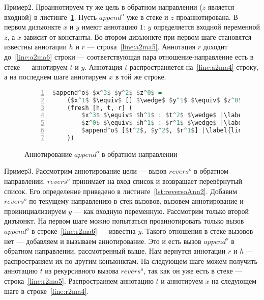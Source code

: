 \documentclass[conference,american,russian]{IEEEtran}
\begin{document}
$Пример 2$. Проаннотируем ту же цель в обратном направлении ($z$ является входной) в листинге~\ref{lst:appendoANN2}.
Пусть $append^o$ уже в стеке и $z$ проаннотирована.
В первом дизъюнкте $x$ и $y$ имеют аннотацию $1$: $y$ определяется входной переменной $z$, а $x$ зависит от константы.
Во втором дизъюнкте при первом шаге становятся известны аннотации $h$ и $r$ --- строка~\ref{line:a2ma5}.
Аннотация $r$ доходит до~\ref{line:a2ma6} строки --- соответствующая пара отношение-направление есть в стеке --- аннотируем $t$ и $y$.
Аннотация $t$ распространяется на~\ref{line:a2ma4} строку, а на последнем шаге аннотируем $x$ в той же строке.

\begin{figure}[h!]
  \begin{center}
  \begin{minipage}{0.3\textwidth}
  \begin{lstlisting}[language=Haskell, frame=single, numbers=left,numberstyle=\small, escapechar=|]
  $append^o$ $x^3$ $y^2$ $z^0$ =
    ($x^1$ $\equiv$ [] $\wedge$ $y^1$ $\equiv$ $z^0$) $\vee$ |\label{line:a2ma2}|
    (fresh [h, t, r] (
        $x^3$ $\equiv$ $h^1$ : $t^2$ $\wedge$ |\label{line:a2ma4}|
        $z^0$ $\equiv$ $h^1$ : $r^1$ $\wedge$ |\label{line:a2ma5}|
        $append^o$ [$t^2$, $y^2$, $r^1$] |\label{line:a2ma6}|
    ))
    \end{lstlisting}
  \end{minipage}
  \end{center}
  \caption{Аннотирование $append^o$ в обратном направлении}
  \label{lst:appendoANN2}
\end{figure}

$Пример 3$. Рассмотрим аннотирование цели --- вызов $revers^o$ в обратном направлении.
$revers^o$ принимает на вход список и возвращает перевёрнутый список.
Его определение приведено в листинге~\ref{lst:reversoAnn2}.
Добавим $revers^o$ по текущему направлению в стек вызовов, вызовем аннотирование и проинициализируем $y$ --- как входную переменную.
Рассмотрим только второй дизъюнкт.
На первом шаге можно попытаться проаннотировать только вызов $append^o$ в строке~\ref{line:r2ma6} --- известна $y$.
Такого отношения в стеке вызовов нет --- добавляем и вызываем аннотирование.
Это и есть вызов $append^o$ в обратном направлении, рассмотренный выше.
Нам вернутся аннотации $r$ и $h$ --- распространяем их по другим конъюнктам.
На следующем шаге можем получить аннотацию $t$ из рекурсивного вызова $revers^o$, так как он уже есть в стеке --- строка~\ref{line:r2ma5}.
Распространяем аннотацию $t$ и аннотируем $x$ на следующем шаге в строке~\ref{line:r2ma4}.
\end{document}
